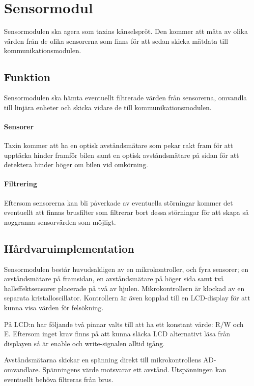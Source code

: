 \documentclass[designspec/spec.tex]{subfiles}
\begin{document}
\section{Sensormodul}
Sensormodulen ska agera som taxins känselspröt. Den kommer att mäta av olika
värden från de olika sensorerna som finns för att sedan skicka mätdata till
kommunikationsmodulen.

\subsection{Funktion}
Sensormodulen ska hämta eventuellt filtrerade värden från sensorerna, omvandla
till linjära enheter och skicka vidare de till kommunikationsmodulen.

\paragraph{Sensorer}
Taxin kommer att ha en optisk avståndsmätare som pekar rakt fram för att
upptäcka hinder framför bilen samt en optisk avståndsmätare på sidan för att
detektera hinder höger om bilen vid omkörning.

\paragraph{Filtrering} Eftersom sensorerna kan bli påverkade av eventuella
störningar kommer det eventuellt att finnas brusfilter som filtrerar bort dessa
störningar för att skapa så noggranna sensorvärden som möjligt.

\subsection{Hårdvaruimplementation}
Sensormodulen består huvudsakligen av en mikrokontroller, och fyra sensorer; en
avståndsmätare på framsidan, en avståndsmätare på höger sida samt två
halleffektsensorer placerade på två av hjulen. Mikrokontrollern är klockad av
en separata kristalloscillator. Kontrollern är även kopplad till en LCD-display
för att kunna visa värden för felsökning.

På LCD:n har följande två pinnar valts till att ha ett konstant värde: R/W och
E. Eftersom inget krav finns på att kunna släcka LCD alternativt läsa från
displayen så är enable och write-signalen alltid igång.

Avståndsmätarna skickar en spänning direkt till mikrokontrollens AD-omvandlare.
Spänningens värde motsvarar ett avstånd. Utspänningen kan eventuellt behöva
filtreras från brus.
\end{document}

